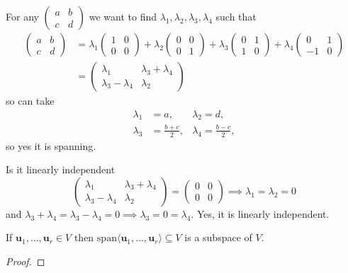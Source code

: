 \documentclass[10pt, a4paper]{article}
\newcommand{\mbf}[1]{\mathbf{#1}}
\begin{document}
For any $\begin{pmatrix}
    a & b \\ c & d
\end{pmatrix}$ we want to find $\lambda_1, \lambda_2, \lambda_3, \lambda_4$ such that
\begin{align*}
\begin{pmatrix}
    a & b \\ c & d
\end{pmatrix}
&=
\lambda_1\begin{pmatrix}
    1 & 0 \\ 0 & 0
\end{pmatrix} + \lambda_2\begin{pmatrix}
    0 & 0 \\ 0 & 1
\end{pmatrix} +
\lambda_3\begin{pmatrix}
    0 & 1 \\ 1 & 0
\end{pmatrix} +
\lambda_4\begin{pmatrix}
    0 & 1 \\ -1 & 0
\end{pmatrix} \\
&= \begin{pmatrix}
    \lambda_1 & \lambda_3 + \lambda_4 \\ \lambda_3 - \lambda_4 & \lambda_2
\end{pmatrix}
\end{align*}
so can take
\begin{align*}
\lambda_1 &= a, &\lambda_2 = d, \\
\lambda_3 &= \frac{b + c}{2}, &\lambda_4 = \frac{b - c}{2},
\end{align*}
so yes it is spanning.

Is it linearly independent
\[
\begin{pmatrix}
    \lambda_1 & \lambda_3 + \lambda_4 \\ \lambda_3 - \lambda_4 & \lambda_2
\end{pmatrix} = \begin{pmatrix}
    0 & 0 \\ 0 & 0
\end{pmatrix}
\implies \lambda_1 = \lambda_2 = 0
\]
and $\lambda_3 + \lambda_4 = \lambda_3 - \lambda_4 = 0 \implies \lambda_3 = 0 = \lambda_4$.
Yes,
it is linearly independent.

\begin{lemma}
    If $\mbf{u}_1, \dotsc, \mbf{u}_r \in V$ then $\mathrm{span}\langle\mbf{u}_1, \dotsc, \mbf{u}_r\rangle \subseteq V$ is a subspace of $V$.
    \begin{proof}
    \end{proof}
\end{lemma}
\end{document}
